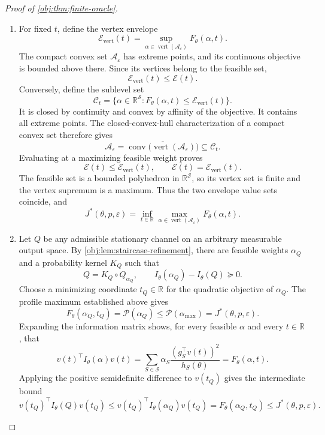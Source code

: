 \begin{proof}[Proof of \cref{obj:thm:finite-oracle}]
\begin{enumerate}
\item For fixed \(t\), define the vertex envelope
\[
\mathscr E_{\mathrm{vert}}(t)
=
\sup_{\alpha\in\operatorname{vert}(\mathcal A_\varepsilon)}
F_\theta(\alpha,t).
\]
The compact convex set \(\mathcal A_\varepsilon\) has extreme
points, and its continuous objective is bounded above there.
Since its vertices belong to the feasible set,
\[
\mathscr E_{\mathrm{vert}}(t)\le\mathscr E(t).
\]
Conversely, define the sublevel set
\[
\mathcal C_t=
\{\alpha\in\mathbb R^{\mathcal S}:
F_\theta(\alpha,t)\le\mathscr E_{\mathrm{vert}}(t)\}.
\]
It is closed by continuity and convex by affinity of the objective.
It contains all extreme points. The closed-convex-hull
characterization of a compact convex set therefore gives
\[
\mathcal A_\varepsilon
=
\overline{\operatorname{conv}
\bigl(\operatorname{vert}(\mathcal A_\varepsilon)\bigr)}
\subseteq\mathcal C_t.
\]
Evaluating at a maximizing feasible weight proves
\[
\mathscr E(t)\le\mathscr E_{\mathrm{vert}}(t),
\qquad
\mathscr E(t)=\mathscr E_{\mathrm{vert}}(t).
\]
The feasible set is a bounded polyhedron in
\(\mathbb R^{\mathcal S}\), so its vertex set is finite and the
vertex supremum is a maximum. Thus the two envelope value sets
coincide, and
\[
J^*(\theta,p,\varepsilon)
=
\inf_{t\in\mathbb R}
\max_{\alpha\in\operatorname{vert}(\mathcal A_\varepsilon)}
F_\theta(\alpha,t).
\]

\item Let \(Q\) be any admissible stationary channel on an arbitrary
measurable output space. By \cref{obj:lem:staircase-refinement},
there are feasible weights \(\alpha_Q\) and a probability kernel
\(K_Q\) such that
\[
Q=K_Q\circ Q_{\alpha_Q},
\qquad
I_\theta(\alpha_Q)-I_\theta(Q)\succeq0.
\]
Choose a minimizing coordinate \(t_Q\in\mathbb R\) for the
quadratic objective of \(\alpha_Q\). The profile maximum established
above gives
\[
F_\theta(\alpha_Q,t_Q)
=\mathscr P(\alpha_Q)
\le\mathscr P(\alpha_{\max})
=J^*(\theta,p,\varepsilon).
\]
Expanding the information matrix shows, for every feasible
\(\alpha\) and every \(t\in\mathbb R\), that
\[
v(t)^\top I_\theta(\alpha)v(t)
=
\sum_{S\in\mathcal S}
\alpha_S\frac{(g_S^\top v(t))^2}{h_S(\theta)}
=F_\theta(\alpha,t).
\]
Applying the positive semidefinite difference to \(v(t_Q)\) gives
the intermediate bound
\[
v(t_Q)^\top I_\theta(Q)v(t_Q)
\le
v(t_Q)^\top I_\theta(\alpha_Q)v(t_Q)
=
F_\theta(\alpha_Q,t_Q)
\le J^*(\theta,p,\varepsilon).
\]


\end{enumerate}
\end{proof}
